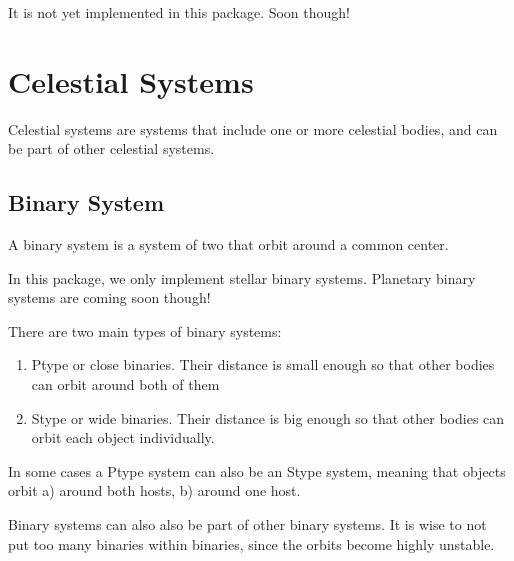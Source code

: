 \documentclass[letterpaper,10pt,english]{sphinxmanual}
\begin{document}
\sphinxAtStartPar
It is not yet implemented in this package. Soon though!


\chapter{Celestial Systems}
\label{\detokenize{celestial_systems/celestial_systems:celestial-systems}}\label{\detokenize{celestial_systems/celestial_systems::doc}}\label{\detokenize{celestial_systems/celestial_systems:id1}}
\sphinxAtStartPar
Celestial systems are systems that include one or more celestial bodies,
and can be part of other celestial systems.


\section{Binary System}
\label{\detokenize{celestial_systems/binary_system:binary-system}}\label{\detokenize{celestial_systems/binary_system::doc}}\label{\detokenize{celestial_systems/binary_system:id1}}
\sphinxAtStartPar
A binary system is a system of two {\hyperref[\detokenize{celestial_bodies/celestial_bodies:id1}]{}} that orbit around a common center.

\sphinxAtStartPar
In this package, we only implement stellar binary systems.
Planetary binary systems are coming soon though!

\sphinxAtStartPar
There are two main types of binary systems:
\begin{enumerate}
%
\item {} 
\sphinxAtStartPar
P\sphinxhyphen{}type or close binaries. Their distance is small enough so that other bodies can orbit around both of them

\item {} 
\sphinxAtStartPar
S\sphinxhyphen{}type or wide binaries. Their distance is big enough so that other bodies can orbit each object individually.

\end{enumerate}

\sphinxAtStartPar
In some cases a P\sphinxhyphen{}type system can also be an S\sphinxhyphen{}type system, meaning that objects orbit
a) around both hosts, b) around one host.

\sphinxAtStartPar
Binary systems can also also be part of other binary systems. It is wise
to not put too many binaries within binaries, since the orbits become highly unstable.
\end{document}
